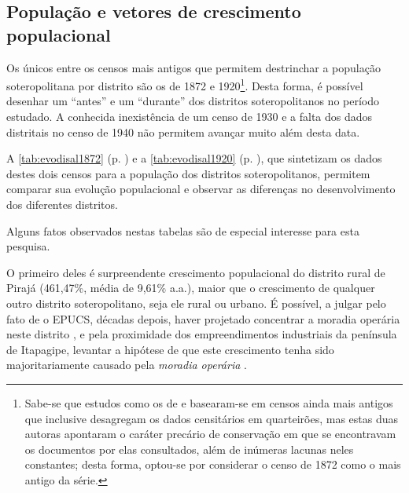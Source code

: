 \subsection{População e vetores de crescimento populacional}\label{subsubsec:populacaosalvador}

Os únicos entre os censos mais antigos que permitem destrinchar a população soteropolitana por distrito são os de 1872 e 1920\footnote{Sabe-se que estudos como os de  e  basearam-se em censos ainda mais antigos que inclusive desagregam os dados censitários em quarteirões, mas estas duas autoras apontaram o caráter precário de conservação em que se encontravam os documentos por elas consultados, além de inúmeras lacunas neles constantes; desta forma, optou-se por considerar o censo de 1872 como o mais antigo da série.}. Desta forma, é possível desenhar um ``antes'' e um ``durante'' dos distritos soteropolitanos no período estudado. A conhecida inexistência de um censo de 1930 e a falta dos dados distritais no censo de 1940 não permitem avançar muito além desta data. 

A \autoref{tab:evodisal1872} (p. \pageref{tab:evodisal1872}) e a \autoref{tab:evodisal1920} (p. \pageref{tab:evodisal1920}), que sintetizam os dados destes dois censos para a população dos distritos soteropolitanos, permitem comparar sua evolução populacional e observar as diferenças no desenvolvimento dos diferentes distritos. 




Alguns fatos observados nestas tabelas são de especial interesse para esta pesquisa.

O primeiro deles é surpreendente crescimento populacional do distrito rural de Pirajá (461,47\%, média de 9,61\% a.a.), maior que o crescimento de qualquer outro distrito soteropolitano, seja ele rural ou urbano. É possível, a julgar pelo fato de o EPUCS, décadas depois, haver projetado concentrar a moradia operária neste distrito \cite{PREFEITURA1978,sampaio_formas_1999}, e pela proximidade dos empreendimentos industriais da península de Itapagipe, levantar a hipótese de que este crescimento tenha sido majoritariamente causado pela \textit{moradia operária} \cite{cardoso_vilas_1991}.

